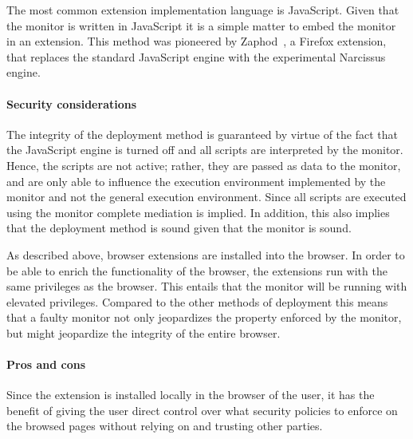 \documentclass{llncs}
\begin{document}
The most common extension implementation language is JavaScript. Given that
the monitor is written in JavaScript it is a simple matter to embed the 
monitor in an extension.
This method was pioneered by Zaphod~\cite{Zaphod}, a
Firefox extension, that replaces the standard JavaScript engine with the
experimental Narcissus~\cite{Narcissus} engine.


\paragraph{Security considerations}

The integrity of the deployment method is guaranteed by virtue of the fact that the
JavaScript engine is turned off and all scripts are interpreted by the monitor.
Hence, the scripts are not active; rather, they are passed as data to the
monitor, and are only able to influence the execution environment implemented
by the monitor and not the general execution environment.
Since all scripts are executed using the monitor complete mediation is implied.
In addition, this also implies that the deployment method is sound given that
the monitor is sound. 

As described above, browser extensions are installed into the browser. In order
to be able to enrich the functionality of the browser, the extensions run with
the same privileges as the browser. This entails that the monitor will be
running with elevated privileges. Compared to the other methods of deployment
this means that a faulty monitor not only jeopardizes the property enforced by
the monitor, but might jeopardize the integrity of the entire browser.

\paragraph{Pros and cons}

Since the extension is installed locally in the browser of the user, it has
the benefit of giving the user direct control over what security policies to 
enforce on the browsed pages without relying on and trusting other parties.
\end{document}
